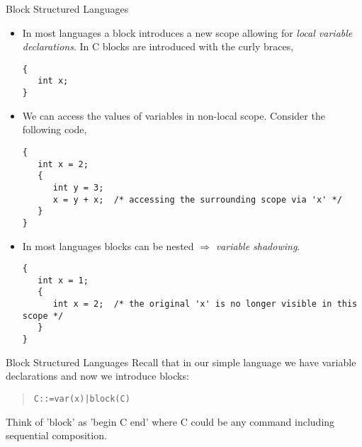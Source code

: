 \documentclass{beamer}
\begin{document}
\begin{frame}[fragile]{Block Structured Languages}

\scriptsize
\begin{itemize}
\item
In most languages a block introduces a new scope allowing for {\em local variable declarations}.
In C blocks are introduced with the curly braces,
{\tiny
\begin{verbatim}
{
   int x;
}
\end{verbatim}
}
\item
We can access the values
of variables in non-local scope.  Consider the following code,
{\tiny
\begin{verbatim}
{
   int x = 2;
   {
      int y = 3;
      x = y + x;  /* accessing the surrounding scope via 'x' */
   }
}
\end{verbatim}
}

\item
In most languages blocks can be nested $\Rightarrow$ {\em variable shadowing}.
{\tiny
\begin{verbatim}
{
   int x = 1;
   {
      int x = 2;  /* the original 'x' is no longer visible in this scope */
   }
}
\end{verbatim}
}
 
\end{itemize}


\end{frame}



\begin{frame}{Block Structured Languages}
Recall that in our simple language we have variable declarations and now we introduce
blocks:
\begin{quote}
\begin{alltt}
C ::=  var(x)  |  block(C)
\end{alltt}
\end{quote}
Think of 'block' as 'begin C end' where C could be any command including sequential composition.
\end{frame}
\end{document}
